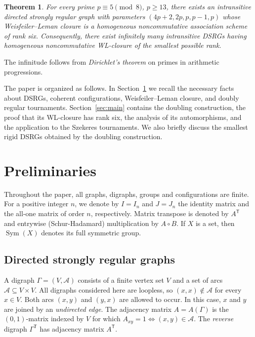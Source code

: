 \documentclass[11pt]{article}
\newtheorem{theorem}{Theorem}[section]
\theoremstyle{definition}
\theoremstyle{remark}
\begin{document}
\begin{theorem}
\label{thm:main}
For every prime $p\equiv5\pmod8$, $p\geq13$, there exists an intransitive
directed strongly regular graph with parameters
$(4p+2,2p,p,p-1,p)$
whose Weisfeiler--Leman closure is a homogeneous noncommutative association
scheme of rank six.  Consequently, there exist infinitely many intransitive
DSRGs having homogeneous noncommutative WL-closure of the smallest possible
rank.
\end{theorem}
The infinitude follows from \emph{Dirichlet's theorem} on primes in arithmetic
progressions. 


The paper is organized as follows.  In Section~\ref{prelim} we
recall the necessary facts about DSRGs, coherent configurations,
Weisfeiler--Leman closure, and doubly regular tournaments.
Section~\ref{sec:main} contains the doubling construction, the
proof that its WL-closure has rank six, the analysis of its automorphisms, and
the application to the Szekeres tournaments.  
We also briefly discuss the smallest rigid DSRGs obtained by the doubling construction. 

\section{Preliminaries}
\label{prelim}

Throughout the paper, all graphs, digraphs, groups and configurations are
finite.  For a positive integer $n$, we denote by $I=I_n$ and $J=J_n$ the
identity matrix and the all-one matrix of order $n$, respectively.  Matrix
transpose is denoted by $A^{\mathsf T}$ and entrywise (Schur-Hadamard) 
multiplication by $A\circ B$.  
If $X$ is a set, then $\operatorname{Sym}(X)$ denotes its full
symmetric group.

\subsection{Directed strongly regular graphs}

A digraph $\Gamma=(V,\mathcal A)$ consists of a finite vertex set $V$ and a
set of arcs
$ \mathcal A\subseteq V\times V$.
All digraphs considered here are loopless, so $(x,x)\notin\mathcal A$ for
every $x\in V$.  Both arcs $(x,y)$ and $(y,x)$ are allowed to occur.  In this
case, $x$ and $y$ are joined by an \emph{undirected edge}.  The adjacency
matrix $A=A(\Gamma)$ is the $(0,1)$-matrix indexed by $V$ for which
$A_{xy}=1\iff (x,y)\in\mathcal A$.
The \emph{reverse} digraph $\Gamma^{\mathsf T}$ has adjacency matrix
$A^{\mathsf T}$.
\end{document}
